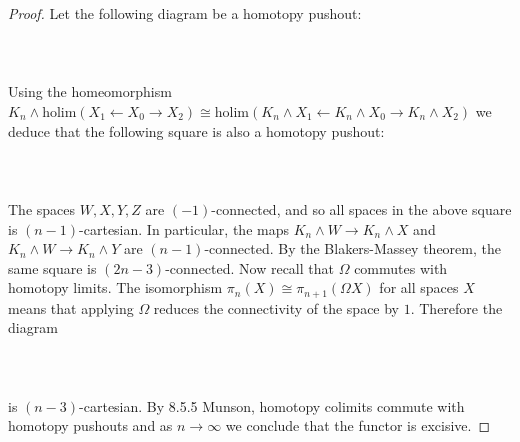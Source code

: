\documentclass[a4paper]{article}
\begin{document}
\begin{prp}{}{}
\begin{proof}
Let the following diagram be a homotopy pushout: \\~\\
\\~\\
Using the homeomorphism $K_n\wedge\text{holim}(X_1\leftarrow X_0\rightarrow X_2)\cong\text{holim}(K_n\wedge X_1\leftarrow K_n\wedge X_0\rightarrow K_n\wedge X_2)$ we deduce that the following square is also a homotopy pushout: \\~\\
\\~\\
The spaces $W,X,Y,Z$ are $(-1)$-connected, and so all spaces in the above square is $(n-1)$-cartesian. In particular, the maps $K_n\wedge W\to K_n\wedge X$ and $K_n\wedge W\to K_n\wedge Y$ are $(n-1)$-connected. By the Blakers-Massey theorem, the same square is $(2n-3)$-connected. Now recall that $\Omega$ commutes with homotopy limits. The  isomorphism $\pi_n(X)\cong\pi_{n+1}(\Omega X)$ for all spaces $X$ means that applying $\Omega$ reduces the connectivity of the space by $1$. Therefore the diagram \\~\\
\\~\\
is $(n-3)$-cartesian. By 8.5.5 Munson, homotopy colimits commute with homotopy pushouts and as $n\to\infty$ we conclude that the functor is excisive. 
\end{proof}
\end{prp}
\end{document}
